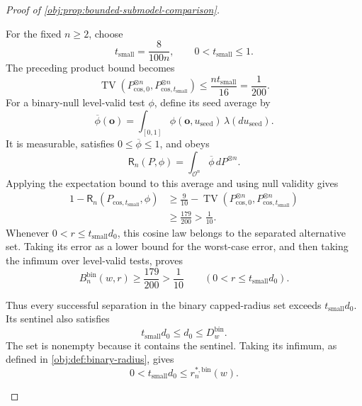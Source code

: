 \documentclass[11pt]{article}
\begin{document}
\begin{proof}[Proof of \cref{obj:prop:bounded-submodel-comparison}]
\begin{enumerate}
For the fixed \(n\ge2\), choose
\[
t_{\mathrm{small}}=\frac8{100n},
\qquad
0<t_{\mathrm{small}}\le1.
\]
The preceding product bound becomes
\[
\operatorname{TV}
\left(
P_{\mathrm{cos},0}^{\otimes n},
P_{\mathrm{cos},t_{\mathrm{small}}}^{\otimes n}
\right)
\le\frac{nt_{\mathrm{small}}}{16}
=\frac1{200}.
\]
For a binary-null level-valid test \(\phi\), define its seed average by
\[
\overline\phi(\boldsymbol o)
=\int_{[0,1]}\phi(\boldsymbol o,u_{\mathrm{seed}})
\,\lambda(du_{\mathrm{seed}}).
\]
It is measurable, satisfies \(0\le\overline\phi\le1\), and obeys
\[
\mathsf R_n(P,\phi)
=\int_{\mathcal O^n}\overline\phi\,dP^{\otimes n}.
\]
Applying the expectation bound to this average and using null validity gives
\[
\begin{split}
1-\mathsf R_n(P_{\mathrm{cos},t_{\mathrm{small}}},\phi)
&\ge
\frac9{10}
-\operatorname{TV}
\left(
P_{\mathrm{cos},0}^{\otimes n},
P_{\mathrm{cos},t_{\mathrm{small}}}^{\otimes n}
\right)\\
&\ge\frac{179}{200}>\frac1{10}.
\end{split}
\]
Whenever \(0<r\le t_{\mathrm{small}}d_0\), this cosine law belongs to the separated alternative set. Taking its error as a lower bound for the worst-case error, and then taking the infimum over level-valid tests, proves
\[
B_n^{\mathrm{bin}}(w,r)\ge\frac{179}{200}>\frac1{10}
\qquad(0<r\le t_{\mathrm{small}}d_0).
\]

Thus every successful separation in the binary capped-radius set exceeds \(t_{\mathrm{small}}d_0\). Its sentinel also satisfies
\[
t_{\mathrm{small}}d_0\le d_0\le D_w^{\mathrm{bin}}.
\]
The set is nonempty because it contains the sentinel. Taking its infimum, as defined in \cref{obj:def:binary-radius}, gives
\[
0<t_{\mathrm{small}}d_0
\le r_n^{*,\mathrm{bin}}(w).
\]


\end{enumerate}
\end{proof}
\end{document}

